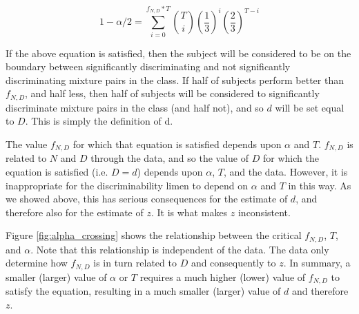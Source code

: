 \documentclass[letterpaper,twocolumn,10pt]{article}
\begin{document}
\begin{equation}
\label{eq:analytical2}
1 - \alpha/2 = \sum_{i=0}^{f_{N,D}*T} \binom{T}{i}(\frac{1}{3})^{i}(\frac{2}{3})^{T-i}
\end{equation}

If the above equation is satisfied, then the subject will be considered to be on the boundary 
between significantly discriminating and not significantly discriminating mixture pairs in the class.  
If half of subjects perform better than $f_{N,D}$, and half less, 
then half of subjects will be considered to significantly discriminate mixture pairs in the class (and half not), 
and so $d$ will be set equal to $D$.  
This is simply the definition of d.

The value $f_{N,D}$ for which that equation is satisfied depends upon $\alpha$ and $T$.  
$f_{N,D}$ is related to $N$ and $D$ through the data, 
and so the value of $D$ for which the equation is satisfied (i.e. $D=d$)
depends upon $\alpha$, $T$, and the data.  
However, it is inappropriate for the discriminability limen to depend on $\alpha$ and $T$ in this way.  
As we showed above, this has serious consequences for the estimate of $d$, and therefore also for the estimate of $z$.  
It is what makes $z$ inconsistent.  

Figure \ref{fig:alpha_crossing} shows the relationship between the critical $f_{N,D}$, $T$, and $\alpha$.  
Note that this relationship is independent of the data.  
The data only determine how $f_{N,D}$ is in turn related to $D$ and consequently to $z$.  
In summary, a smaller (larger) value of $\alpha$ or $T$ requires a much higher (lower) value of $f_{N,D}$ to satisfy the equation, 
resulting in a much smaller (larger) value of $d$ and therefore $z$.  
\end{document}
